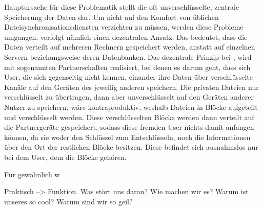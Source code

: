 Hauptursache für diese Problematik stellt die oft unverschlüsselte, zentrale Speicherung der Daten dar. Um nicht auf den Komfort von üblichen Dateisynchronisationsdiensten verzichten zu müssen, werden diese Probleme umgangen. \sblit verfolgt nämlich einen dezentralen Ansatz. Das bedeutet, dass die Daten verteilt auf mehreren Rechnern gespeichert werden, anstatt auf einzelnen Servern beziehungsweise deren Datenbanken. Das dezentrale Prinzip bei \sblit, wird mit sogenannten Partnerschaften realisiert, bei denen es darum geht, dass sich User, die sich gegenseitig nicht kennen, einander ihre Daten über verschlüsselte Kanäle auf den Geräten des jeweilig anderen speichern. Die privaten Dateien nur verschlüsselt zu übertragen, dann aber unverschlüsselt auf den Geräten anderer Nutzer zu speichern, wäre kontraproduktiv, weshalb Dateien in Blöcke aufgeteilt und verschlüsselt werden. Diese verschlüsselten Blöcke werden dann verteilt auf die Partnergeräte gespeichert, sodass diese fremden User nichts damit anfangen können, da sie weder den Schlüssel zum Entschlüsseln, noch die Informationen über den Ort der restlichen Blöcke besitzen. Diese befindet sich ausnahmslos nur bei dem User, dem die Blöcke gehören.

Für gewöhnlich w





Praktisch --> Funktion.
Was stört uns daran?
Wie machen wir es?
Warum ist unseres so cool?
Warum sind wir so geil?
